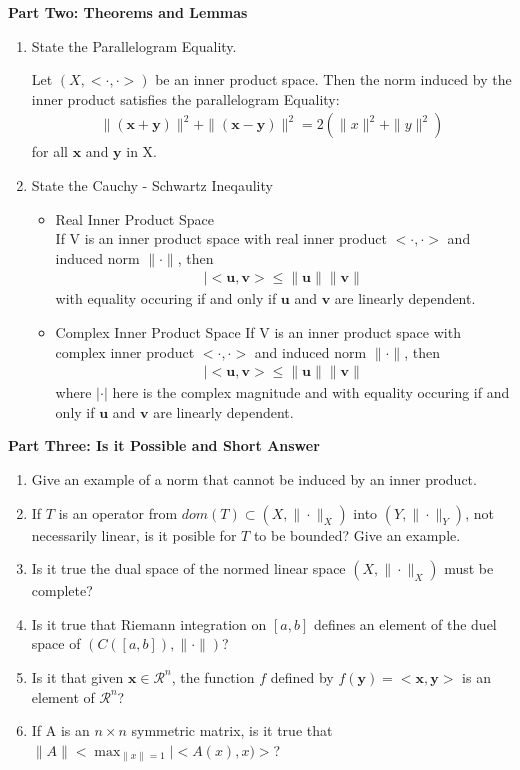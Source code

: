 \documentclass[11pt]{SelfArxOneColBMN}
\begin{document}
\textbf{Part Two: Theorems and Lemmas}
\begin{enumerate}
  \item State the Parallelogram Equality.
  \begin{solution}
    Let $(X,<\cdot,\cdot>)$ be an inner product space. Then the norm induced by the inner product satisfies the parallelogram Equality:
    \begin{eqnarray*}
      \|(\mathbf{x} + \mathbf{y})\|^2 + \|(\mathbf{x} - \mathbf{y})\|^2 = 2(\|x\|^2 + \|y\|^2)
    \end{eqnarray*}
    for all $\mathbf{x}$ and $\mathbf{y}$ in X.
  \end{solution}
  \item State the Cauchy - Schwartz Ineqaulity
  \begin{solution}
    \begin{itemize}
      \item Real Inner Product Space\\
      If V is an inner product space with real inner product $<\cdot,\cdot>$ and induced norm $\|\cdot\|$, then
      \begin{eqnarray*}
        |<\mathbf{u},\mathbf{v}> \leq \|\mathbf{u}\|\|\mathbf{v}\|
      \end{eqnarray*}
      with equality occuring if and only if $\mathbf{u}$ and $\mathbf{v}$ are linearly dependent.
      \item Complex Inner Product Space
      If V is an inner product space with complex inner product $<\cdot,\cdot>$ and induced norm $\|\cdot\|$, then
      \begin{eqnarray*}
        |<\mathbf{u},\mathbf{v}> \leq \|\mathbf{u}\|\|\mathbf{v}\|
      \end{eqnarray*}
      where $|\cdot|$ here is the complex magnitude and with equality occuring if and only if $\mathbf{u}$ and $\mathbf{v}$ are linearly dependent.
    \end{itemize}
  \end{solution}
\end{enumerate}

\textbf{Part Three: Is it Possible and Short Answer}
\begin{enumerate}
  \item Give an example of a norm that cannot be induced by an inner product.
  \item If $T$ is an operator from $dom(T) \subset (X,\|\cdot\|_X)$ into $(Y,\|\cdot\|_Y)$, not necessarily linear, is it posible for $T$ to be bounded? Give an example.
  \item Is it true the dual space of the normed linear space $(X,\|\cdot\|_X)$ must be complete?
  \item Is it true that Riemann integration on $[a,b]$ defines an element of the duel space of $(C([a,b]),\|\cdot\|)$?
  \item Is it that given $\mathbf{x} \in \mathcal{R}^n$, the function $f$ defined by $f(\mathbf{y}) = <\mathbf{x},\mathbf{y}>$ is an element of $\mathcal{R}^n$?
  \item If A is an $n \times n$ symmetric matrix, is it true that $\|A\| < \max_{\|x\| = 1}|<A(x),x)>$?
\end{enumerate}
\end{document}
